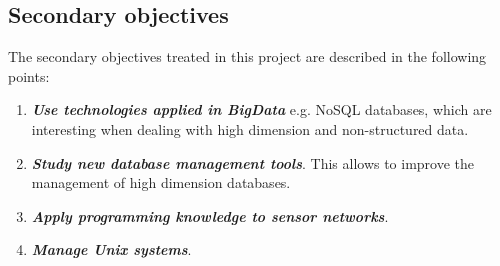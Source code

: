 \subsection{Secondary objectives}

The secondary objectives treated in this project are described in the following points:

\begin{enumerate}

\item \textbf{\textit{Use technologies applied in BigData}} \cite{que_es_big_data, importancia_big_data, big_data_applications} e.g. NoSQL \cite{que_es_no_sql, sql_vs_nosql, nosql_databases} databases, which are interesting when dealing with high dimension and non-structured data.

\item \textbf{\textit{Study new database management tools}}. This allows to improve the management of high dimension databases.

\item \textbf{\textit{Apply programming knowledge to sensor networks}}.

\item \textbf{\textit{Manage Unix systems}}.

\end{enumerate}






